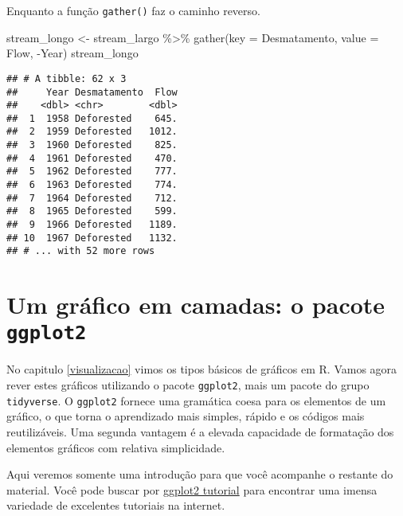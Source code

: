 \documentclass[
]{book}
\newenvironment{Shaded}{\begin{snugshade}}{\end{snugshade}}
\newcommand{\AttributeTok}[1]{\textcolor[rgb]{0.77,0.63,0.00}{#1}}
\newcommand{\FunctionTok}[1]{\textcolor[rgb]{0.00,0.00,0.00}{#1}}
\newcommand{\NormalTok}[1]{#1}
\newcommand{\OtherTok}[1]{\textcolor[rgb]{0.56,0.35,0.01}{#1}}
\newcommand{\SpecialCharTok}[1]{\textcolor[rgb]{0.00,0.00,0.00}{#1}}
\begin{document}
Enquanto a função \texttt{gather()} faz o caminho reverso.

\begin{Shaded}
\begin{Highlighting}[]
\NormalTok{stream\_longo }\OtherTok{\textless{}{-}}\NormalTok{ stream\_largo }\SpecialCharTok{\%\textgreater{}\%} 
  \FunctionTok{gather}\NormalTok{(}\AttributeTok{key =}\NormalTok{ Desmatamento, }\AttributeTok{value =}\NormalTok{ Flow, }\SpecialCharTok{{-}}\NormalTok{Year)}
\NormalTok{stream\_longo}
\end{Highlighting}
\end{Shaded}

\begin{verbatim}
## # A tibble: 62 x 3
##     Year Desmatamento  Flow
##    <dbl> <chr>        <dbl>
##  1  1958 Deforested    645.
##  2  1959 Deforested   1012.
##  3  1960 Deforested    825.
##  4  1961 Deforested    470.
##  5  1962 Deforested    777.
##  6  1963 Deforested    774.
##  7  1964 Deforested    712.
##  8  1965 Deforested    599.
##  9  1966 Deforested   1189.
## 10  1967 Deforested   1132.
## # ... with 52 more rows
\end{verbatim}

\hypertarget{ggplot2}{%
\chapter{\texorpdfstring{Um gráfico em camadas: o pacote \texttt{ggplot2}}{Um gráfico em camadas: o pacote ggplot2}}\label{ggplot2}}

No capitulo \ref{visualizacao} vimos os tipos básicos de gráficos em R. Vamos agora rever estes gráficos utilizando o pacote \texttt{ggplot2}, mais um pacote do grupo \texttt{tidyverse}. O \texttt{ggplot2} fornece uma gramática coesa para os elementos de um gráfico, o que torna o aprendizado mais simples, rápido e os códigos mais reutilizáveis. Uma segunda vantagem é a elevada capacidade de formatação dos elementos gráficos com relativa simplicidade.

Aqui veremos somente uma introdução para que você acompanhe o restante do material. Você pode buscar por \href{https://www.google.com/search?hl=pt-BR\&sxsrf=ALeKk01rZWda0HD1IRGtCyelLv79_WDmkg\%3A1594409577512\&source=hp\&ei=acIIX9HVG4vD5OUPgamfOA\&q=ggplot2+tutorial\&oq=ggplot2+tutorial\&gs_lcp=CgZwc3ktYWIQAzIECCMQJzICCAAyBggAEBYQHjIGCAAQFhAeMgYIABAWEB4yBggAEBYQHjIGCAAQFhAeMgYIABAWEB4yBggAEBYQHjIGCAAQFhAeUJILWJILYJIhaABwAHgAgAF5iAF5kgEDMC4xmAEAoAECoAEBqgEHZ3dzLXdpeg\&sclient=psy-ab\&ved=0ahUKEwiRrvbDtsPqAhWLIbkGHYHUBwcQ4dUDCAc\&uact=5}{ggplot2 tutorial} para encontrar uma imensa variedade de excelentes tutoriais na internet.
\end{document}
